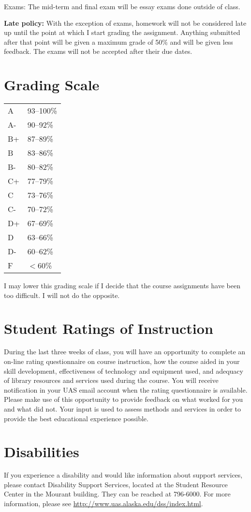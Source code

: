 \documentclass[11pt,letterpaper]{article}
\newcommand{\squeezeup}{\vspace{-2.5mm}}
\begin{document}
Exams: The mid-term and final exam will be essay exams done outside of class.

\textbf{Late policy:} With the exception of exams, homework will not be considered late up until the point at which I start grading the assignment. Anything submitted after that point will be given a maximum grade of 50\% and will be given less feedback. The exams will not be accepted after their due dates.

\clearpage
\section*{Grading Scale}
\begin{table}[h!]
\squeezeup
\begin{tabular}{ll}
A & 93--100\% \\
A- & 90--92\% \\
B+ & 87--89\% \\
B & 83--86\% \\
B- & 80--82\% \\
C+ & 77--79\% \\
C & 73--76\% \\
C- & 70--72\% \\
D+ & 67--69\% \\
D & 63--66\% \\
D- & 60--62\% \\
F & $<$60\%
\end{tabular}
\end{table}

I may lower this grading scale if I decide that the course assignments have been too difficult. I will not do the opposite.


\section*{Student Ratings of Instruction}
During the last three weeks of class, you will have an opportunity to complete an on-line rating questionnaire on course instruction, how the course aided in your skill development,  effectiveness of technology and equipment used, and adequacy of library resources and services used during the course. You will receive notification in your UAS email account when the rating questionnaire is available. Please make use of this opportunity to provide feedback on what worked for you and what did not. Your input is used to assess methods and services in order to provide the best educational experience possible.

\section*{Disabilities}
If you experience a disability and would like information about support services, please contact Disability Support Services, located at the Student Resource Center in the Mourant building.  They can be reached at 796-6000. For more information, please see \url{http://www.uas.alaska.edu/dss/index.html}.
\end{document}
